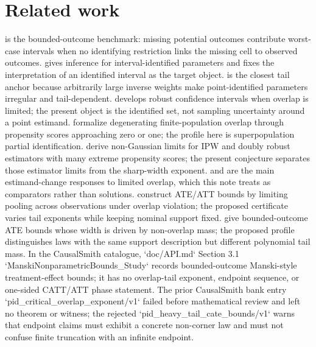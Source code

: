 \documentclass[11pt]{article}
\theoremstyle{definition}
\theoremstyle{plain}
\theoremstyle{remark}
\begin{document}
\section{Related work}
\citet[pp.~319--320]{Manski1990NonparametricBounds} is the bounded-outcome benchmark:
missing potential outcomes contribute worst-case intervals when no identifying restriction
links the missing cell to observed outcomes. \citet{ImbensManski2004ConfidenceIntervals} gives inference for
interval-identified parameters and fixes the interpretation of an identified interval as
the target object. \citet[p.~2021 and Sec.~2]{KhanTamer2010IrregularIdentification} is the closest tail
anchor because arbitrarily large inverse weights make point-identified parameters
irregular and tail-dependent. \citet[Sec.~2]{Rothe2017LimitedOverlapCI} develops robust
confidence intervals when overlap is limited; the present object is the identified set,
not sampling uncertainty around a point estimand. \citet[Sec.~2]{HongLeungLi2020FinitePopulationLimitedOverlap}
formalize degenerating finite-population overlap through propensity scores approaching
zero or one; the profile here is superpopulation partial identification. \citet[Sec.~3]{HeilerKazak2021ExtremePropensity}
derive non-Gaussian limits for IPW and doubly robust estimators with many extreme
propensity scores; the present conjecture separates those estimator limits from the
sharp-width exponent. \citet{CrumpHotzImbensMitnik2009Trimming} and
\citet{LiMorganZaslavsky2018OverlapWeights} are the main estimand-change responses to
limited overlap, which this note treats as comparators rather than solutions.
\citet[Abstract and Sec.~2]{LeeWeidner2026LimitedPoolingBounds} construct ATE/ATT bounds by limiting pooling
across observations under overlap violation; the proposed certificate varies tail
exponents while keeping nominal support fixed. \citet[Sec.~2]{SusmannMcCleanDiaz2025NonOverlapATEBounds}
give bounded-outcome ATE bounds whose width is driven by non-overlap mass; the proposed
profile distinguishes laws with the same support description but different polynomial tail
mass. In the CausalSmith catalogue, `doc/API.md` Section 3.1
`ManskiNonparametricBounds_Study` records bounded-outcome Manski-style treatment-effect
bounds; it has no overlap-tail exponent, endpoint sequence, or one-sided CATT/ATT phase
statement. The prior CausalSmith bank entry `pid_critical_overlap_exponent/v1` failed
before mathematical review and left no theorem or witness; the rejected
`pid_heavy_tail_cate_bounds/v1` warns that endpoint claims must exhibit a concrete
non-corner law and must not confuse finite truncation with an infinite endpoint.
\end{document}
